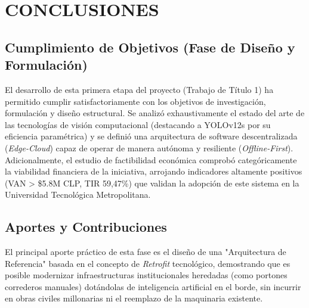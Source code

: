 %

\chapter*{CONCLUSIONES}


\section*{Cumplimiento de Objetivos (Fase de Diseño y Formulación)}

El desarrollo de esta primera etapa del proyecto (Trabajo de Título 1) ha permitido cumplir satisfactoriamente con los objetivos de investigación, formulación y diseño estructural. Se analizó exhaustivamente el estado del arte de las tecnologías de visión computacional (destacando a YOLOv12s por su eficiencia paramétrica) y se definió una arquitectura de software descentralizada (\textit{Edge-Cloud}) capaz de operar de manera autónoma y resiliente (\textit{Offline-First}). Adicionalmente, el estudio de factibilidad económica comprobó categóricamente la viabilidad financiera de la iniciativa, arrojando indicadores altamente positivos (VAN > \$5.8M CLP, TIR 59,47\%) que validan la adopción de este sistema en la Universidad Tecnológica Metropolitana.

\section*{Aportes y Contribuciones}

El principal aporte práctico de esta fase es el diseño de una "Arquitectura de Referencia" basada en el concepto de \textit{Retrofit} tecnológico, demostrando que es posible modernizar infraestructuras institucionales heredadas (como portones correderos manuales) dotándolas de inteligencia artificial en el borde, sin incurrir en obras civiles millonarias ni el reemplazo de la maquinaria existente. 

